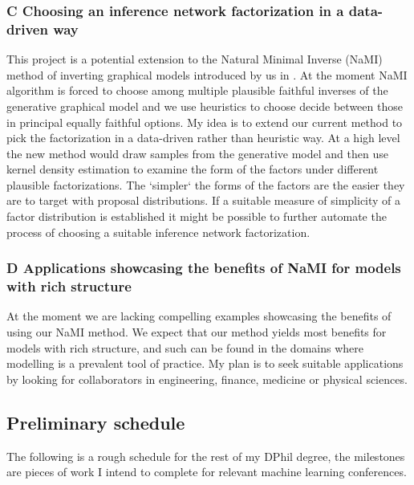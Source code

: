 \documentclass[12pt]{article}
\begin{document}
\subsubsection*{C \quad Choosing an inference network factorization in a data-driven way}
This project is a potential extension to the Natural Minimal Inverse (NaMI) method of inverting graphical models introduced by us in \citep{Webb2018}.
At the moment NaMI algorithm is forced to choose among multiple plausible faithful inverses of the generative graphical model and we use  heuristics to choose decide between those in principal equally faithful options.
My idea is to extend our current method to pick the factorization in a data-driven rather than heuristic way.
At a high level the new method would draw samples from the generative model and then use kernel density estimation to examine the form of the factors under different plausible factorizations. 
The `simpler` the forms of the factors are the easier they are to target with proposal distributions.
If a suitable measure of simplicity of a factor distribution is established it might be possible to further automate the process of choosing a suitable inference network factorization.


\subsubsection*{D \quad Applications showcasing the benefits of NaMI for models with rich structure}
At the moment we are lacking compelling examples showcasing the benefits of using our NaMI method.
We expect that our method yields most benefits for models with rich structure, and such can be found in the domains where
modelling is a prevalent tool of practice.
My plan is to seek suitable applications by looking for collaborators in engineering, finance, medicine or physical sciences.


\newpage
\subsection{Preliminary schedule}
The following is a rough schedule for the rest of my DPhil degree, the milestones are pieces of work I intend to complete for relevant machine learning conferences.
\end{document}
